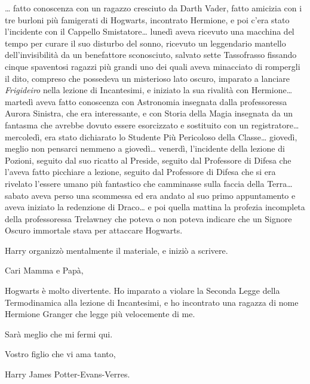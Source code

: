 … fatto conoscenza con un ragazzo cresciuto da Darth Vader, fatto amicizia con i tre burloni più famigerati di Hogwarts, incontrato Hermione, e poi c’era stato l’incidente con il Cappello Smistatore… lunedì aveva ricevuto una macchina del tempo per curare il suo disturbo del sonno, ricevuto un leggendario mantello dell’invisibilità da un benefattore sconosciuto, salvato sette Tassofrasso fissando cinque spaventosi ragazzi più grandi uno dei quali aveva minacciato di rompergli il dito, compreso che possedeva un misterioso lato oscuro, imparato a lanciare \textit{Frigideiro} nella lezione di Incantesimi, e iniziato la sua rivalità con Hermione… martedì aveva fatto conoscenza con Astronomia insegnata dalla professoressa Aurora Sinistra, che era interessante, e con Storia della Magia insegnata da un fantasma che avrebbe dovuto essere esorcizzato e sostituito con un registratore… mercoledì, era stato dichiarato lo Studente Più Pericoloso della Classe… giovedì, meglio non pensarci nemmeno a giovedì… venerdì, l’incidente della lezione di Pozioni, seguito dal suo ricatto al Preside, seguito dal Professore di Difesa che l’aveva fatto picchiare a lezione, seguito dal Professore di Difesa che si era rivelato l’essere umano più fantastico che camminasse sulla faccia della Terra… sabato aveva perso una scommessa ed era andato al suo primo appuntamento e aveva iniziato la redenzione di Draco… e poi quella mattina la profezia incompleta della professoressa Trelawney che poteva o non poteva indicare che un Signore Oscuro immortale stava per attaccare Hogwarts.

Harry organizzò mentalmente il materiale, e iniziò a scrivere.

\vspace{1em}
\begin{addmargin}[3em]{3em}%
\begin{itpars}

Cari Mamma e Papà,

Hogwarts è molto divertente. Ho imparato a violare la Seconda Legge della Termodinamica alla lezione di Incantesimi, e ho incontrato una ragazza di nome Hermione Granger che legge più velocemente di me.

Sarà meglio che mi fermi qui.

Vostro figlio che vi ama tanto,

Harry James Potter-Evans-Verres.

\end{itpars}
\end{addmargin}
\vspace{1em}

